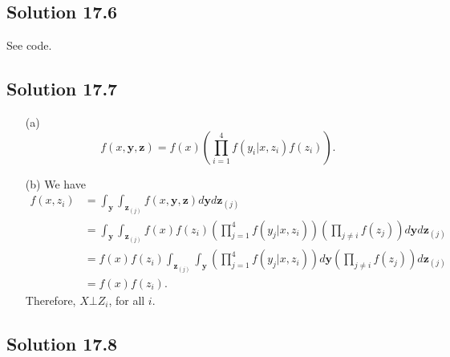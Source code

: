 \subsection*{Solution 17.6}

See code.


\subsection*{Solution 17.7}

\begin{itemize}
    \item[(a)]
        \begin{equation*}
            f(x, \bm{y}, \bm{z}) = f(x) \left(\prod_{i = 1}^4 f(y_i|x, z_i) f(z_i) \right).
        \end{equation*}
    \item[(b)] We have
        \begin{equation*}
            \begin{split}
                f(x, z_i)
                    &= \int_{\bm{y}} \int_{\bm{z}_{(j)}} f(x, \bm{y}, \bm{z}) d\bm{y} d\bm{z}_{(j)} \\
                    &= \int_{\bm{y}} \int_{\bm{z}_{(j)}}
                            f(x) f(z_i)
                            \left(\prod_{j = 1}^4 f(y_j|x, z_i) \right)
                            \left(\prod_{j \neq i} f(z_j) \right)
                        d\bm{y} d\bm{z}_{(j)} \\
                    &= f(x) f(z_i)
                            \int_{\bm{z}_{(j)}} \int_{\bm{y}}
                                \left(\prod_{j = 1}^4 f(y_j|x, z_i) \right)
                            d\bm{y}
                        \left(\prod_{j \neq i} f(z_j) \right) d\bm{z}_{(j)} \\
                    &= f(x) f(z_i).
            \end{split}
        \end{equation*}
    Therefore, $X \bot Z_i$, for all $i$.
\end{itemize}


\subsection*{Solution 17.8}

